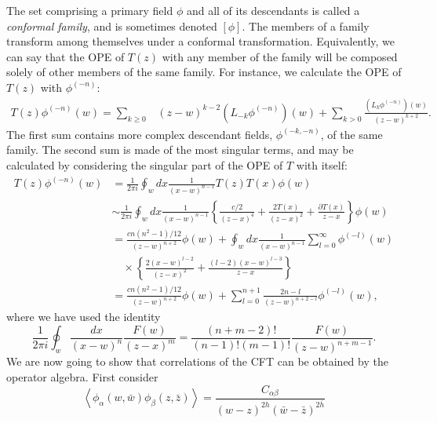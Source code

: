 \documentclass[aps,prb,superscriptaddress,nofootinbib]{revtex4}
\begin{document}
The set comprising a primary field $\phi$ and all of its descendants is called a \textit{conformal family}, and is sometimes denoted $[\phi]$. 
The members of a family transform among themselves under a conformal transformation. 
Equivalently, we can say that the OPE of $T(z)$ with any member of the family will be composed solely of other members of the same family.
For instance, we calculate the OPE of $T(z)$ with $\phi^{(-n)}$:
\begin{equation}
\begin{aligned}
	T(z) \phi^{(-n)}(w)=\sum_{k \geq 0} &(z-w)^{k-2}\left(L_{-k} \phi^{(-n)}\right)(w) 
	+\sum_{k>0} \frac{\left(L_{k} \phi^{(-n)}\right)(w)}{(z-w)^{k+2}}.
\end{aligned}
\end{equation}
The first sum contains more complex descendant fields, $\phi^{(-k,-n)}$, of the same family. The second sum is made of the most singular terms, and may be calculated by considering the singular part of the OPE of $T$ with itself:
\begin{equation}
\begin{aligned}
	T(z) \phi^{(-n)}(w) 
	&=\frac{1}{2 \pi i} \oint_{w} d x \frac{1}{(x-w)^{n-1}} T(z) T(x) \phi(w) \\
	&\sim \frac{1}{2 \pi i} \oint_{w} d x \frac{1}{(x-w)^{n-1}}\left\{\frac{c / 2}{(z-x)^{4}}+\frac{2 T(x)}{(z-x)^{2}}+\frac{\partial T(x)}{z-x}\right\} \phi(w) \\
	&= \frac{c n\left(n^{2}-1\right) / 12}{(z-w)^{n+2}} \phi(w)+\oint_{w} d x \frac{1}{(x-w)^{n-1}} \sum_{l=0}^{\infty} \phi^{(-l)}(w) \\
	&\quad \times\left\{\frac{2(x-w)^{l-2}}{(z-x)^{2}}+\frac{(l-2)(x-w)^{l-3}}{z-x}\right\} \\
	&= \frac{c n\left(n^{2}-1\right) / 12}{(z-w)^{n+2}} \phi(w)+\sum_{l=0}^{n+1} \frac{2 n-l}{(z-w)^{n+2-l}} \phi^{(-l)}(w),
\end{aligned}
\end{equation}
where we have used the identity
\begin{equation}
	\frac{1}{2 \pi i} \oint_{w} \frac{d x}{(x-w)^{n}} \frac{F(w)}{(z-x)^{m}}=\frac{(n+m-2) !}{(n-1) !(m-1) !} \frac{F(w)}{(z-w)^{n+m-1}}.
\end{equation}
We are now going to show that correlations of the CFT can be obtained by the operator algebra.
First consider
\begin{equation}
	\left\langle\phi_{\alpha}(w, \bar{w}) \phi_{\beta}(z, \bar{z})\right\rangle=\frac{C_{\alpha \beta}}{(w-z)^{2 h}(\bar{w}-\bar{z})^{2 \bar{h}}}
\end{equation}
\end{document}

